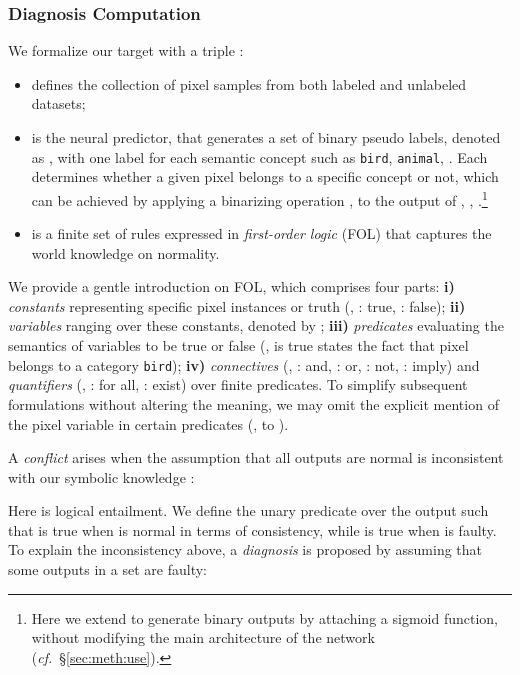 \documentclass[10pt,twocolumn,letterpaper]{article}
\begin{document}
\vspace{-3pt}
\subsubsection{Diagnosis Computation}\label{sec:meth:define:DC}
We formalize our target with a triple :
\begin{itemize}[leftmargin=*]
   \setlength{\itemsep}{0pt}
   \setlength{\parsep}{-2pt}
   \setlength{\parskip}{-0pt}
   \setlength{\leftmargin}{-10pt}

   \item  defines the collection of pixel samples from both labeled and unlabeled datasets;
   \item  is the neural predictor, that generates a set of binary pseudo labels, denoted as , with one label for each semantic concept such as \texttt{bird}, \texttt{animal}, \etc.
   Each  determines whether a given pixel  belongs to a specific concept or not, 
   which can be achieved by applying a binarizing operation , to the output of , \ie, .\footnote{Here we extend  to generate binary outputs by attaching a sigmoid function, without modifying the main architecture of the network (\textit{cf.\!}~\S\ref{sec:meth:use}).}
   \item  is a finite set of rules expressed in \textit{first-order logic} (FOL) that captures the world knowledge on normality.
\end{itemize}
We provide a gentle introduction on FOL, which comprises four parts:
\textbf{i)} \textit{constants} representing specific pixel instances  or truth (\ie, : true, : false);
\textbf{ii)} \textit{variables} ranging over these constants, denoted by ;
\textbf{iii)} \textit{predicates} evaluating the semantics of variables to be true or false (\eg,  is true states the fact that pixel  belongs to a category \texttt{bird});
\textbf{iv)} \textit{connectives} (\eg, : and, : or, : not, : imply) and \textit{quantifiers} (\ie, : for all, : exist) over finite predicates.
To simplify subsequent formulations without altering the meaning, we may omit the explicit mention of the pixel variable  in certain predicates (\eg,  to ).

A \textit{conflict} arises when the assumption that all outputs are normal is inconsistent with our symbolic knowledge :
\vspace{-3pt}

Here  is logical entailment. We define the unary predicate  over the output  such that  is true when  is normal in terms of consistency, while  is true when  is faulty.
To explain the inconsistency above, a \textit{diagnosis} is proposed by assuming that some outputs in a set  are faulty:
\vspace{-3pt}
\end{document}
